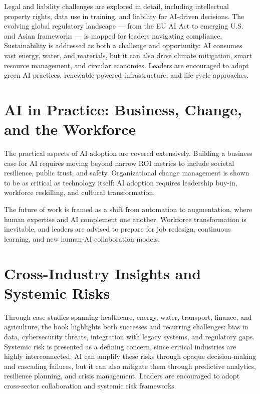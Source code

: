 Legal and liability challenges are explored in detail, including intellectual property rights, data use in training, 
and liability for AI-driven decisions. The evolving global regulatory landscape --- from the EU AI Act to emerging U.S. and Asian frameworks --- 
is mapped for leaders navigating compliance. Sustainability is addressed as both a challenge and opportunity: AI consumes vast energy, water, 
and materials, but it can also drive climate mitigation, smart resource management, and circular economies. Leaders are encouraged to adopt 
green AI practices, renewable-powered infrastructure, and life-cycle approaches.

\section*{AI in Practice: Business, Change, and the Workforce}
The practical aspects of AI adoption are covered extensively. Building a business case for AI requires moving beyond narrow ROI metrics to include 
societal resilience, public trust, and safety. Organizational change management is shown to be as critical as technology itself: 
AI adoption requires leadership buy-in, workforce reskilling, and cultural transformation. 

The future of work is framed as a shift from automation to augmentation, where human expertise and AI complement one another. 
Workforce transformation is inevitable, and leaders are advised to prepare for job redesign, continuous learning, and new human-AI collaboration models. 

\section*{Cross-Industry Insights and Systemic Risks}
Through case studies spanning healthcare, energy, water, transport, finance, and agriculture, the book highlights both successes and recurring challenges: 
bias in data, cybersecurity threats, integration with legacy systems, and regulatory gaps. 
Systemic risk is presented as a defining concern, since critical industries are highly interconnected. 
AI can amplify these risks through opaque decision-making and cascading failures, but it can also mitigate them through predictive analytics, 
resilience planning, and crisis management. Leaders are encouraged to adopt cross-sector collaboration and systemic risk frameworks. 

